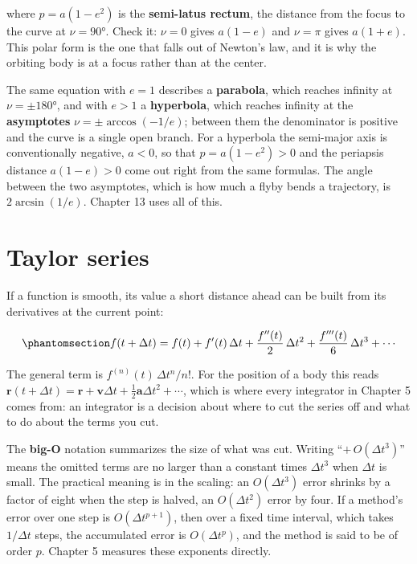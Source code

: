 \documentclass[
  10.5pt,
  letterpaper,
]{scrbook}
\theoremstyle{definition}
\theoremstyle{plain}
\theoremstyle{remark}
\begin{document}
where \(p = a(1-e^2)\) is the \textbf{semi-latus rectum}, the distance
from the focus to the curve at \(\nu = 90°\). Check it: \(\nu = 0\)
gives \(a(1-e)\) and \(\nu = \pi\) gives \(a(1+e)\). This polar form is
the one that falls out of Newton's law, and it is why the orbiting body
is at a focus rather than at the center.

The same equation with \(e = 1\) describes a \textbf{parabola}, which
reaches infinity at \(\nu = \pm 180°\), and with \(e > 1\) a
\textbf{hyperbola}, which reaches infinity at the \textbf{asymptotes}
\(\nu = \pm\arccos(-1/e)\); between them the denominator is positive and
the curve is a single open branch. For a hyperbola the semi-major axis
is conventionally negative, \(a < 0\), so that \(p = a(1-e^2) > 0\) and
the periapsis distance \(a(1-e) > 0\) come out right from the same
formulas. The angle between the two asymptotes, which is how much a
flyby bends a trajectory, is \(2\arcsin(1/e)\). Chapter 13 uses all of
this.

\section{Taylor series}\label{taylor-series}

If a function is smooth, its value a short distance ahead can be built
from its derivatives at the current point:

\begin{equation}\protect\phantomsection\label{eq-taylor-general}{
f(t + \Delta t) = f(t) + f'(t)\,\Delta t + \frac{f''(t)}{2}\,\Delta t^2 + \frac{f'''(t)}{6}\,\Delta t^3 + \cdots
}\end{equation}

The general term is \(f^{(n)}(t)\,\Delta t^n/n!\). For the position of a
body this reads
\(\mathbf{r}(t+\Delta t) = \mathbf{r} + \mathbf{v}\Delta t + \tfrac12\mathbf{a}\Delta t^2 + \cdots\),
which is where every integrator in Chapter 5 comes from: an integrator
is a decision about where to cut the series off and what to do about the
terms you cut.

The \textbf{big-O} notation summarizes the size of what was cut. Writing
``\(+\,O(\Delta t^3)\)'' means the omitted terms are no larger than a
constant times \(\Delta t^3\) when \(\Delta t\) is small. The practical
meaning is in the scaling: an \(O(\Delta t^3)\) error shrinks by a
factor of eight when the step is halved, an \(O(\Delta t^2)\) error by
four. If a method's error over one step is \(O(\Delta t^{p+1})\), then
over a fixed time interval, which takes \(1/\Delta t\) steps, the
accumulated error is \(O(\Delta t^p)\), and the method is said to be of
order \(p\). Chapter 5 measures these exponents directly.
\end{document}
